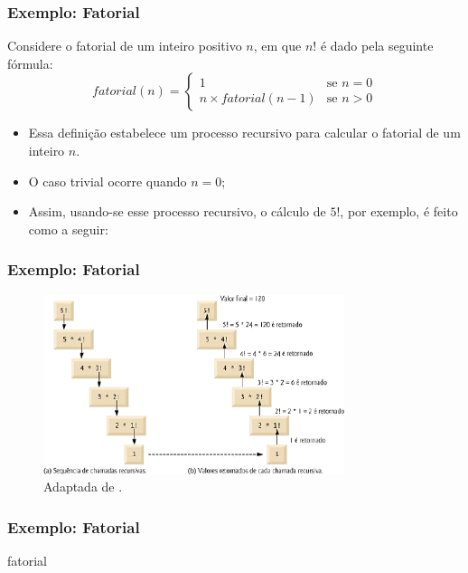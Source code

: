 \documentclass[aspectratio=169]{beamer}
\begin{document}
\begin{frame}
\frametitle{Exemplo: Fatorial}
 Considere o fatorial de um inteiro positivo $n$, em que $n!$ é dado pela seguinte fórmula:
\begin{equation*}
    fatorial(n) = \begin{cases}
               1                & \text{se } n = 0 \\
               n \times fatorial(n-1) & \text{se } n > 0 
           \end{cases}
\end{equation*}
\begin{itemize}
\pause
\item Essa definição estabelece um processo recursivo para calcular o fatorial de um inteiro $n$.
\item O caso trivial ocorre quando $n = 0$;
\item Assim, usando-se esse processo recursivo, o cálculo de $5!$, por exemplo, é feito como a seguir:
\end{itemize}

\end{frame}


\begin{frame}
\frametitle{Exemplo: Fatorial}

\begin{figure}[!h]
  \centering
  \includegraphics[width=250pt]{imgs/exemplo1_fatorial.png}
  \caption{\footnotesize{Adaptada de .}}
  \label{fig_exemplo_fatorial}
\end{figure}
\end{frame}


\begin{frame}[fragile]
\frametitle{Exemplo: Fatorial}
\begin{algorithm}[H]
\caption{fatorial} 
\label{fatorial}
\end{algorithm}
\end{frame}
\end{document}
